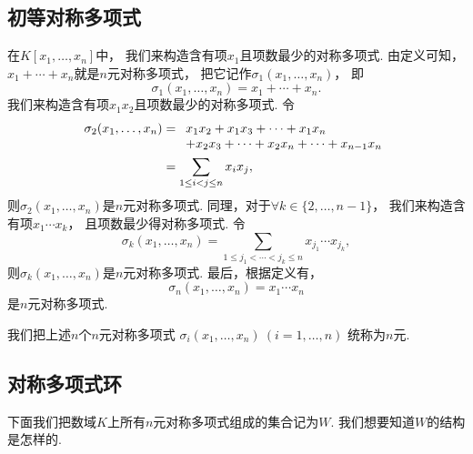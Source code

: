 \subsection{初等对称多项式}
在\(K[x_1,\dotsc,x_n]\)中，
我们来构造含有项\(x_1\)且项数最少的对称多项式.
由定义可知，
\(x_1+\dotsb+x_n\)就是\(n\)元对称多项式，
把它记作\(\sigma_1(x_1,\dotsc,x_n)\)，
即\begin{equation*}
	\sigma_1(x_1,\dotsc,x_n)
	=x_1+\dotsb+x_n.
\end{equation*}
我们来构造含有项\(x_1x_2\)且项数最少的对称多项式.
令\begin{align*}
	\sigma_2(x_1,\dotsc,x_n)
	&=\begin{array}[t]{l}
		x_1x_2+x_1x_3+\dotsb+x_1x_n \\
		+x_2x_3+\dotsb+x_2x_n
		+\dotsb
		+x_{n-1}x_n
	\end{array} \\
	&=\sum_{1\leq i<j\leq n} x_i x_j,
\end{align*}
则\(\sigma_2(x_1,\dotsc,x_n)\)是\(n\)元对称多项式.
同理，对于\(\forall k\in\{2,\dotsc,n-1\}\)，
我们来构造含有项\(x_1 \dotsm x_k\)，
且项数最少得对称多项式.
令\begin{equation*}
	\sigma_k(x_1,\dotsc,x_n)
	=\sum_{1\leq j_1<\dotsb<j_k\leq n}
	x_{j_1} \dotsm x_{j_k},
\end{equation*}
则\(\sigma_k(x_1,\dotsc,x_n)\)是\(n\)元对称多项式.
最后，根据定义有，\begin{equation*}
	\sigma_n(x_1,\dotsc,x_n)
	=x_1 \dotsm x_n
\end{equation*}是\(n\)元对称多项式.

我们把上述\(n\)个\(n\)元对称多项式
\(\sigma_i(x_1,\dotsc,x_n)\ (i=1,\dotsc,n)\)
统称为\(n\)元.

\subsection{对称多项式环}
下面我们把数域\(K\)上所有\(n\)元对称多项式组成的集合记为\(W\).
我们想要知道\(W\)的结构是怎样的.

